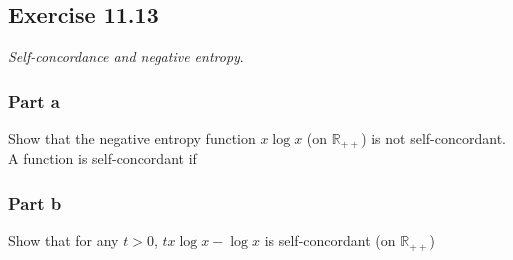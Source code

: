 \subsection{Exercise 11.13} 
\textit{Self-concordance and negative entropy}.
\subsubsection{Part a}
Show that the negative entropy function $x \log x$ (on $\mathbb{R}_{++}$) is not self-concordant. \\
A function is self-concordant if 

\subsubsection{Part b}
Show that for any $t > 0$, $tx \log x - \log x $ is self-concordant (on $\mathbb{R}_{++}$)